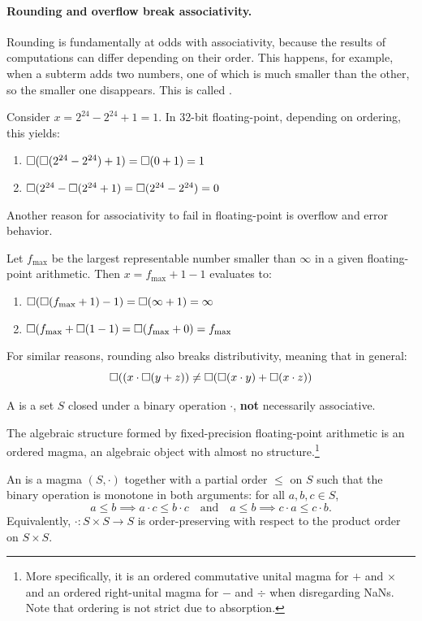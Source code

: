 \documentclass{article}
\begin{document}
\paragraph{Rounding and overflow break associativity.} 
Rounding is fundamentally at odds with associativity, because the results of computations can differ depending on their order. This happens, for example, when a subterm adds two numbers, one of which is much smaller than the other, so the smaller one disappears. This is called .
\begin{example}[Absorption]
Consider $x=2^{24}-2^{24} + 1 = 1$. In 32-bit floating-point, depending on ordering, this yields:
\begin{enumerate}[label=(\roman*)]
    \item $\square(\square(2^{24}-2^{24}) + 1) = \square(0 + 1) = 1$
    \item $\square(2^{24}-\square(2^{24} + 1) = \square(2^{24} - 2^{24}) = 0$
\end{enumerate}
\end{example}
Another reason for associativity to fail in floating-point is overflow and error behavior.
\begin{example}[Overflow]
    Let $f_{\max}$ be the largest representable number smaller than $\infty$ in a given floating-point arithmetic. Then $x = f_{\max} + 1 - 1$ evaluates to:
    \begin{enumerate}[label=(\roman*)]
    \item $\square(\square(f_{\max} + 1) - 1) = \square(\infty + 1) = \infty$
    \item $\square(f_{\max}+\square(1-1) = \square(f_{\max} + 0) = f_{\max} $
\end{enumerate}
\end{example}
For similar reasons, rounding also breaks distributivity, meaning that in general:
$$
\square((x\cdot \square(y + z)) \neq \square(\square(x\cdot y)+\square(x \cdot z))
$$
\begin{definition}[Magma]
A  is a set $S$ closed under a binary operation $\cdot$, \textbf{not} necessarily associative.
\end{definition}
The algebraic structure formed by fixed-precision floating-point arithmetic is an 
ordered magma, an algebraic object with almost no structure.\footnote{More specifically, it is an ordered commutative unital magma for $+$ and $\times$ and an ordered right-unital magma for $-$ and $\div$ when disregarding NaNs. Note that ordering is not strict due to absorption.}
\begin{definition}
An  is a magma $(S,\cdot)$ together with a partial order $\leq$ on $S$ such that the binary operation is monotone in both arguments: for all $a,b,c \in S$,
\[
a \leq b \implies a \cdot c \leq b \cdot c
\quad\text{and}\quad
a \leq b \implies c \cdot a \leq c \cdot b.
\]
Equivalently, $\cdot: S \times S \to S$ is order-preserving with respect to the product order on $S \times S$.
\end{definition}
\end{document}
